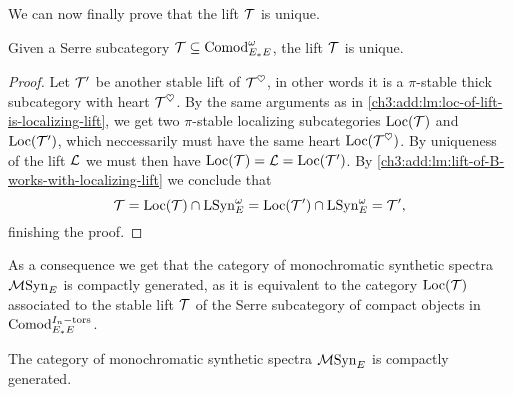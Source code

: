 We can now finally prove that the lift $\mathcal{T}$ is unique. 

\begin{theorem}
    \label{ch3:add:thm:uniqueness-of-lift}
    Given a Serre subcategory $\mathcal{T}\subseteq \mathrm{Comod}_{E_*E}^\omega$, the lift $\mathcal{T}$ is unique. 
\end{theorem}
\begin{proof}
    Let $\mathcal{T}'$ be another stable lift of $\mathcal{T}^\heartsuit$, in other words it is a $\pi$-stable thick subcategory with heart $\mathcal{T}^\heartsuit$. By the same arguments as in \cref{ch3:add:lm:loc-of-lift-is-localizing-lift}, we get two $\pi$-stable localizing subcategories $\operatorname{Loc}(\mathcal{T})$ and $\operatorname{Loc}(\mathcal{T}')$, which neccessarily must have the same heart $\operatorname{Loc}(\mathcal{T}^\heartsuit)$. By uniqueness of the lift $\mathcal{L}$ we must then have $\operatorname{Loc}(\mathcal{T}) = \mathcal{L} = \operatorname{Loc}(\mathcal{T}')$. By \cref{ch3:add:lm:lift-of-B-works-with-localizing-lift} we conclude that 
    \[\mathcal{T} = \operatorname{Loc}(\mathcal{T})\cap \mathrm{LSyn}_{E}^\omega = \operatorname{Loc}(\mathcal{T}')\cap \mathrm{LSyn}_{E}^\omega = \mathcal{T}',\]
    finishing the proof. 
\end{proof}

As a consequence we get that the category of monochromatic synthetic spectra $\mathcal{M}\mathrm{Syn}_{E}$ is compactly generated, as it is equivalent to the category $\operatorname{Loc}(\mathcal{T})$ associated to the stable lift $\mathcal{T}$ of the Serre subcategory of compact objects in $\mathrm{Comod}_{E_*E}^{I_n-\mathrm{tors}}$. 

\begin{corollary}
    The category of monochromatic synthetic spectra $\mathcal{M}\mathrm{Syn}_{E}$ is compactly generated. 
\end{corollary}




